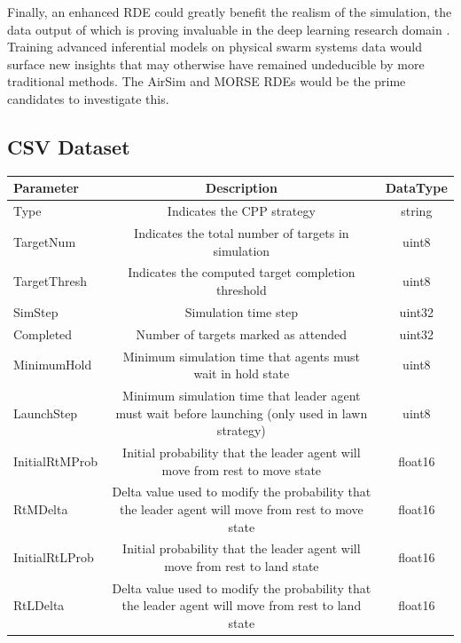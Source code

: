 \documentclass{report}
\begin{document}
Finally, an enhanced RDE could greatly benefit the realism of the simulation, the data output of which is proving invaluable in the deep learning research domain \cite{Shah2018}. Training advanced inferential models on physical swarm systems data would surface new insights that may otherwise have remained undeducible by more traditional methods. The AirSim \cite{Shah2018} and MORSE \cite{Morse2011} RDEs would be the prime candidates to investigate this.




\begin{appendices}
\chapter{CSV Dataset}
\begin{table}
	\scriptsize
	\begin{center}
		\begin{tabular}{|l|c|c|}
			\hline
			\textbf{Parameter} & \textbf{Description} & \textbf{DataType} \\
			\hline
			Type & Indicates the CPP strategy & string \\
			TargetNum & Indicates the total number of targets in simulation & uint8 \\
			TargetThresh & Indicates the computed target completion threshold & uint8 \\
			SimStep & Simulation time step & uint32 \\
			Completed & Number of targets marked as attended & uint32 \\
			MinimumHold & Minimum simulation time that agents must wait in hold state & uint8 \\
			LaunchStep & Minimum simulation time that leader agent must wait before launching (only used in lawn strategy) & uint8 \\
			InitialRtMProb & Initial probability that the leader agent will move from rest to move state & float16 \\
			RtMDelta & Delta value used to modify the probability that the leader agent will move from rest to move state & float16 \\
			InitialRtLProb & Initial probability that the leader agent will move from rest to land state & float16 \\
			RtLDelta  & Delta value used to modify the probability that the leader agent will move from rest to land state & float16 \\

\end{tabular}
\end{center}
\end{table}
\end{appendices}
\end{document}

